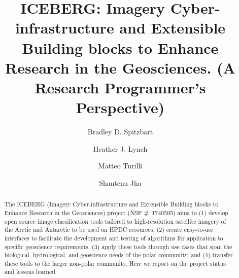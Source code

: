 \documentclass[manuscript,screen]{acmart}
\begin{document}
\title[ICEBERG (A Research Programmer's Perspective)]{
	ICEBERG:
	Imagery Cyber-infrastructure and Extensible Building blocks to Enhance Research in the Geosciences. (A Research Programmer's Perspective)
}

\author{Bradley D. Spitzbart}
\author{Heather J. Lynch}

\author{Matteo Turilli}
\author{Shantenu Jha}


\begin{abstract}
	The ICEBERG (Imagery Cyber-infrastructure and Extensible Building blocks to Enhance Research in the Geosciences) project (NSF \#~1740595) aims to (1) develop open source image classification tools tailored to high-resolution satellite imagery of the Arctic and Antarctic to be used on HPDC resources, (2) create easy-to-use interfaces to facilitate the development and testing of algorithms for application to specific geoscience requirements, (3) apply these tools through use cases that span the biological, hydrological, and geoscience needs of the polar community, and (4) transfer these tools to the larger non-polar community. Here we report on the project status and lessons learned.
\end{abstract}
\end{document}

